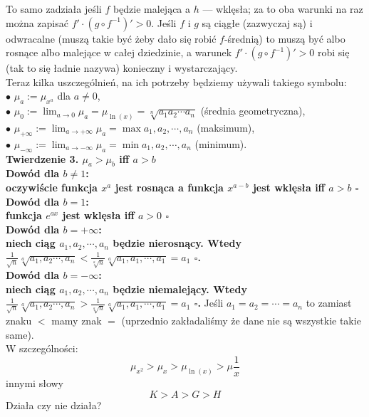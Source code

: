 \documentclass{article}
\begin{document}
To samo zadziała jeśli $f$ będzie malejąca a $h$ --- wklęsła; za to oba warunki na raz można zapisać $f'\cdot(g\circ f^{-1})'>0$.
Jeśli $f$ i $g$ są ciągłe (zazwyczaj są) i odwracalne (muszą takie być żeby dało się robić $f$-średnią) to muszą być albo rosnące albo malejące w całej dziedzinie, a warunek $f'\cdot(g\circ f^{-1})'>0$ robi się (tak to się ładnie nazywa) konieczny i wystarczający.
\\Teraz kilka uszczególnień, na ich potrzeby będziemy używali takiego symbolu:
\\$\bullet$ $\mu_a:=\mu_{x^a}$ dla $a\neq 0$,
\\$\bullet$ $\mu_0:=\lim_{a\to0}\mu_a=\mu_{\ln(x)}=\sqrt[n]{a_1a_2\cdots a_n}$ (średnia geometryczna),
\\$\bullet$ $\mu_{+\infty}:=\lim_{a\to+\infty}\mu_a=\max{a_1, a_2, \cdots, a_n}$ (maksimum),
\\$\bullet$ $\mu_{-\infty}:=\lim_{a\to-\infty}\mu_a=\min{a_1, a_2, \cdots, a_n}$ (minimum).
\\\textbf{Twierdzenie 3. $\mu_a>\mu_b$ iff $a>b$
\\Dowód dla $b\neq 1$:
\\oczywiście funkcja $x^a$ jest rosnąca a funkcja $x^{a-b}$ jest wklęsła iff $a>b$ $\square$
\\Dowód dla $b=1$:
\\funkcja $e^{ax}$ jest wklęsła iff $a>0$ $\square$
\\Dowód dla $b=+\infty$:
\\niech ciąg $a_1, a_2, \cdots, a_n$ będzie nierosnący. Wtedy $\frac1{\sqrt{n}}\sqrt[a]{a_1, a_2\cdots, a_n} < \frac1{\sqrt[a]{n}}\sqrt[a]{a_1, a_1, \cdots, a_1} = a_1$ $\square$.
\\Dowód dla $b=-\infty$:
\\niech ciąg $a_1, a_2, \cdots, a_n$ będzie niemalejący. Wtedy $\frac1{\sqrt{n}}\sqrt[a]{a_1, a_2\cdots, a_n} > \frac1{\sqrt[a]{n}}\sqrt[a]{a_1, a_1, \cdots, a_1} = a_1$ $\square$.
}
Jeśli $a_1=a_2=\cdots=a_n$ to zamiast znaku $<$ mamy znak $=$ (uprzednio zakładaliśmy że dane nie są wszystkie takie same).
\\W szczególności:\[
	\mu_{x^2}>\mu_x>\mu_{\ln(x)}>\mu{\frac1x}
\]
innymi słowy\[K>A>G>H\] Działa czy nie działa?
\end{document}
